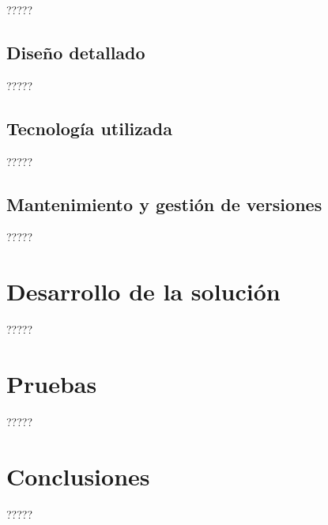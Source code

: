 \documentclass[11pt,spanish,listoffigures]{tfgetsinf}
\begin{document}
?????

\section{Diseño detallado}

?????

\section{Tecnología utilizada}

?????

\section{Mantenimiento y gestión de versiones}

?????


\chapter{Desarrollo de la solución}

?????


\chapter{Pruebas}

?????


\chapter{Conclusiones}

?????

\end{document}
